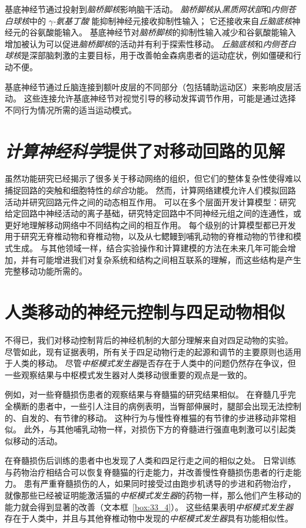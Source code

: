 基底神经节通过投射到\textit{脑桥脚核}影响脑干活动。
\textit{脑桥脚核}从\textit{黑质网状部}和\textit{内侧苍白球核}中的 \textit{$\gamma$-氨基丁酸} 能抑制神经元接收抑制性输入；
它还接收来自\textit{丘脑底核}神经元的谷氨酸能输入。
基底神经节对\textit{脑桥脚核}的抑制性输入减少和谷氨酸能输入增加被认为可以促进\textit{脑桥脚核}的活动并有利于探索性移动。
\textit{丘脑底核}和\textit{内侧苍白球核}是深部脑刺激的主要目标，用于改善帕金森病患者的运动症状，例如僵硬和行动不便。


基底神经节通过丘脑连接到额叶皮层的不同部分（包括辅助运动区）来影响皮层活动。
这些连接允许基底神经节对视觉引导的移动发挥调节作用，可能是通过选择不同行为情况所需的适当运动模式。



\section{\textit{计算神经科学}提供了对移动回路的见解}

虽然功能研究已经揭示了很多关于移动网络的组织，但它们的整体复杂性使得难以捕捉回路的突触和细胞特性的\textit{综合}功能。
然而，计算网络建模允许人们模拟回路活动并研究回路元件之间的动态相互作用。
可以在多个层面开发计算模型：研究给定回路中神经活动的离子基础，研究特定回路中不同神经元组之间的连通性，或更好地理解移动网络中不同结构之间的相互作用。
每个级别的计算模型都已开发用于研究无脊椎动物和脊椎动物，以及从七鳃鳗到哺乳动物的脊椎动物的节律和模式生成。
与其他领域一样，结合实验操作和计算建模的方法在未来几年可能会增加，并有可能增进我们对复杂系统和结构之间相互联系的理解，而这些结构是产生完整移动功能所需的。


\section{人类移动的神经元控制与四足动物相似}

不得已，我们对移动控制背后的神经机制的大部分理解来自对四足动物的实验。
尽管如此，现有证据表明，所有关于四足动物行走的起源和调节的主要原则也适用于人类的移动。
尽管\textit{中枢模式发生器}是否存在于人类中的问题仍然存在争议，但一些观察结果与中枢模式发生器对人类移动很重要的观点是一致的。


例如，对一些脊髓损伤患者的观察结果与脊髓猫的研究结果相似。
在脊髓几乎完全横断的患者中，一些引人注目的病例表明，当臀部伸展时，腿部会出现无法控制的、自发的、有节律的移动。
这种行为与慢性脊椎猫的有节律的步进移动非常相似。
此外，与其他哺乳动物一样，对损伤下方的脊髓进行强直电刺激可以引起类似移动的活动。


在脊髓损伤后训练的患者中也发现了人类和四足行走之间的相似之处。
日常训练与药物治疗相结合可以恢复脊髓猫的行走能力，并改善慢性脊髓损伤患者的行走能力。
患有严重脊髓损伤的人，如果同时接受过由跑步机诱导的步进和药物治疗，就像那些已经被证明能激活猫的\textit{中枢模式发生器}的药物一样，那么他们产生移动的能力就会得到显著的改善（文本框~\ref{box:33_4}）。
这些结果表明\textit{中枢模式发生器}存在于人类中，并且与其他脊椎动物中发现的\textit{中枢模式发生器}具有功能相似性。



